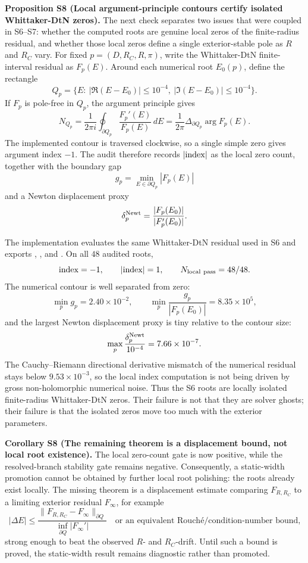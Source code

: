 \documentclass[aps,prd,onecolumn,notitlepage,nofootinbib,superscriptaddress,11pt,floatfix]{revtex4-2}
\begin{document}
\medskip\noindent\textbf{Proposition S8 (Local argument-principle contours certify isolated Whittaker-DtN zeros).}
The next check separates two issues that were coupled in S6--S7: whether the computed roots are genuine local zeros of the finite-radius residual, and whether those local zeros define a single exterior-stable pole as \(R\) and \(R_C\) vary.  For fixed \(p=(D,R_C,R,\pi)\), write the Whittaker-DtN finite-interval residual as \(F_p(E)\).  Around each numerical root \(E_0(p)\), define the rectangle
\[
Q_p=\{E:\ |\Re(E-E_0)|\le 10^{-4},\ |\Im(E-E_0)|\le 10^{-4}\}.
\]
If \(F_p\) is pole-free in \(Q_p\), the argument principle gives
\[
N_{Q_p}
=\frac{1}{2\pi i}\oint_{\partial Q_p}\frac{F_p'(E)}{F_p(E)}\,dE
=\frac{1}{2\pi}\Delta_{\partial Q_p}\arg F_p(E).
\]
The implemented contour is traversed clockwise, so a single simple zero gives argument index \(-1\).  The audit therefore records \(|{\rm index}|\) as the local zero count, together with the boundary gap
\[
g_p=\min_{E\in\partial Q_p}|F_p(E)|
\]
and a Newton displacement proxy
\[
\delta_p^{\rm Newt}=\frac{|F_p(E_0)|}{|F_p'(E_0)|}.
\]

The implementation  evaluates the same Whittaker-DtN residual used in S6 and exports , , and .  On all \(48\) audited roots,
\[
{\rm index}=-1,\qquad |{\rm index}|=1,
\qquad N_{\rm local\ pass}=48/48 .
\]
The numerical contour is well separated from zero:
\[
\min_p g_p=2.40\times10^{-2},
\qquad
\min_p \frac{g_p}{|F_p(E_0)|}=8.35\times10^5,
\]
and the largest Newton displacement proxy is tiny relative to the contour size:
\[
\max_p\frac{\delta_p^{\rm Newt}}{10^{-4}}
=7.66\times10^{-7}.
\]
The Cauchy--Riemann directional derivative mismatch of the numerical residual stays below \(9.53\times10^{-3}\), so the local index computation is not being driven by gross non-holomorphic numerical noise.  Thus the S6 roots are locally isolated finite-radius Whittaker-DtN zeros.  Their failure is not that they are solver ghosts; their failure is that the isolated zeros move too much with the exterior parameters.

\medskip\noindent\textbf{Corollary S8 (The remaining theorem is a displacement bound, not local root existence).}
The local zero-count gate is now positive, while the resolved-branch stability gate remains negative.  Consequently, a static-width promotion cannot be obtained by further local root polishing: the roots already exist locally.  The missing theorem is a displacement estimate comparing \(F_{R,R_C}\) to a limiting exterior residual \(F_\infty\), for example
\[
|\Delta E|
\le
\frac{\|F_{R,R_C}-F_\infty\|_{\partial Q}}{\inf_{\partial Q}|F_\infty'|}
\quad\text{or an equivalent Rouché/condition-number bound,}
\]
strong enough to beat the observed \(R\)- and \(R_C\)-drift.  Until such a bound is proved, the static-width result remains diagnostic rather than promoted.
\end{document}
